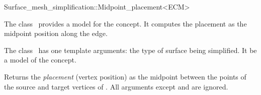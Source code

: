 

\begin{ccRefClass}{Surface_mesh_simplification::Midpoint_placement<ECM>}


\ccDefinition

The class \ccRefName\ provides a model for the  concept. 
It computes the placement as the midpoint position along the edge.

The class \ccRefName\ has one template arguments: the type of surface being simplified. 
It be a model of the  concept.


\ccIsModel
{}

\ccCreation
{}  %

  {Returns the {\em placement} (vertex position) as the midpoint between 
  the points of the source and target vertices of  . All arguments
  except  and  are ignored.
  }

\end{ccRefClass}


